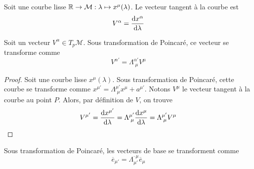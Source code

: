 \begin{theoremframe}
    \begin{defi}
        Soit une courbe lisse $\mathbb{R} \to \mathcal{M}: \lambda \mapsto x^\mu (\lambda)$. Le vecteur tangent à la courbe est
        \begin{equation}
            V^\alpha = \frac{\mathrm{d} x^\alpha}{\mathrm{d} \lambda}
        \end{equation}
    \end{defi}
\end{theoremframe}
\begin{theoremframe}
\begin{propri}
    Soit un vecteur $V^\alpha\in T_p\mathcal{M}$. Sous transformation de Poincaré, ce vecteur se transforme comme
    \begin{equation}
        V^{\alpha'} = \Lambda^{\alpha'}_{\; \mu} V^\mu
    \end{equation}
\end{propri}
\end{theoremframe}
\begin{proof}
    Soit une courbe lisse $x^\mu(\lambda)$. Sous transformation de Poincaré, cette courbe se transforme comme $x^{\mu'} = \Lambda^{\mu'}_{\; \mu} x^\mu + a^{\mu'}$. Notons $V^\mu$ le vecteur tangent à la courbe au point $P$. Alors, par définition de $V$, on trouve
    \begin{align}
        V^{\mu'} = \frac{\mathrm{d} x^{\mu'}}{\mathrm{d} \lambda} = \Lambda^{\mu'}_{\; \mu} \frac{\mathrm{d} x^{\mu}}{\mathrm{d} \lambda} = \Lambda^{\mu'}_{\; \mu} V^\mu
    \end{align}
\end{proof}
\begin{theoremframe}
    \begin{propri}
        Sous transformation de Poincaré, les vecteurs de base se transforment comme
        \begin{equation}
            \overline{e}_{\mu '} = \Lambda^{\cdot\,\mu}_{\mu'}\overline{e}_{\mu}
        \end{equation}
    \end{propri}
\end{theoremframe}
